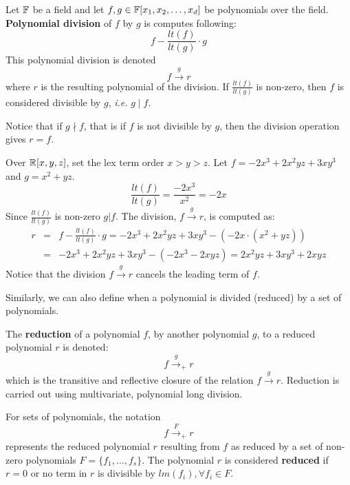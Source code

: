 \begin{Definition}
Let ${\mathbb{F}}$ be a field and let $f, g \in {\mathbb{F}}[x_1, x_2, \ldots, x_d]$ be polynomials
over the field. {\bf Polynomial division} of $f$ by $g$ is computes following:
\begin{equation}
f-\frac{lt(f)}{lt(g)}\cdot g
\end{equation}
This polynomial division is denoted
\begin{equation}
f\xrightarrow{g} r
\end{equation}
where $r$ is the resulting polynomial of the division.
If $\frac{lt(f)}{lt(g)}$ is non-zero, then $f$ is considered divisible by $g$, 
{\it i.e.} $g \mid f$.
\end{Definition}
Notice that if $g \nmid f$, that is if $f$ is not divisible by $g$,
then the division operation gives $r = f$.
\begin{Example}
Over ${\mathbb{R}}[x,y,z]$, set the lex term order $x > y > z$.
Let $f = -2x^3 + 2x^2yz + 3xy^3$ and $g = x^2+yz$.
\begin{equation}
\frac{lt(f)}{lt(g)} = \frac{-2x^3}{x^2} = -2x
\end{equation}
Since $\frac{lt(f)}{lt(g)}$ is non-zero $g|f$. The division, $f\xrightarrow{g} r$, 
is computed as:
\begin{eqnarray}
r &=& f-\frac{lt(f)}{lt(g)}\cdot g = -2x^3 + 2x^2yz + 3xy^3 - (-2x \cdot (x^2+yz)) \nonumber \\
&=& -2x^3 + 2x^2yz + 3xy^3 - (-2x^3-2xyz) = 2x^2yz + 3xy^3 + 2xyz
\end{eqnarray}
Notice that the division $f\stackrel{g}{\textstyle\longrightarrow}r$ cancels the leading term of $f$.
\end{Example}

Similarly, we can also define when a polynomial is divided (reduced) by a set of polynomials.
\begin{Definition}
    The {\bf reduction} of a polynomial $f$, by another polynomial $g$, to
    a reduced polynomial $r$ is denoted:
    \begin{equation*}
        f\stackrel{g}{\textstyle\longrightarrow}_{+}r
    \end{equation*}
    which is the transitive and reflective closure of the relation $f\stackrel{g}{\textstyle\longrightarrow}r$. 
    Reduction is carried out using multivariate, polynomial long division. 
  
    For sets of polynomials, the notation 
    \begin{equation*}
    f\stackrel{F}{\textstyle\longrightarrow}_+r    
    \end{equation*}
    represents the reduced polynomial $r$ resulting from $f$ as reduced by a 
    set of non-zero polynomials $F = \{f_1,\dots,f_s\}$.  The polynomial $r$ is considered {\bf reduced} if 
    $r = 0$  or no term in $r$ is divisible  by $lm(f_i), \forall f_i \in F$.
\end{Definition}

